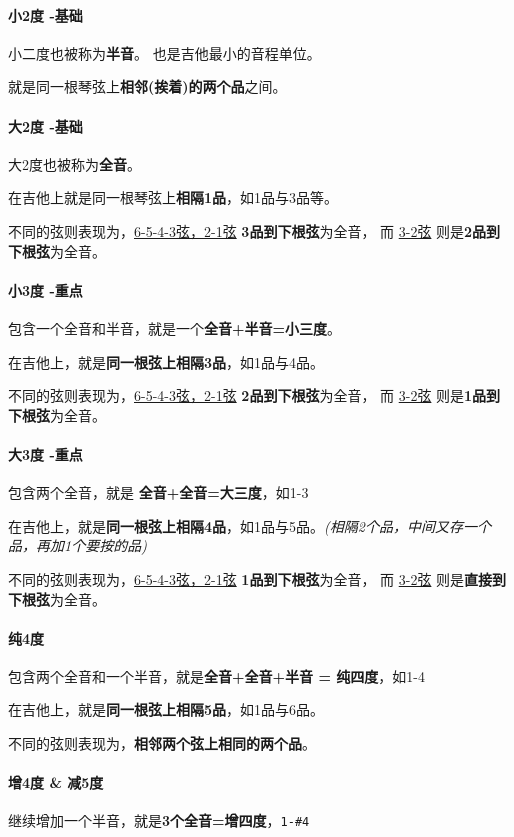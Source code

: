 \documentclass[UTF8,a4paper,12pt]{ctexbook}
\begin{document}
			\paragraph{小2度 -基础}
				小二度也被称为\textbf{半音}。 也是吉他最小的音程单位。
				
				就是同一根琴弦上\textbf{相邻(挨着)的两个品}之间。
				
			\paragraph{大2度 -基础}
				大2度也被称为\textbf{全音}。
				
				在吉他上就是同一根琴弦上\textbf{相隔1品}，如1品与3品等。
				
				不同的弦则表现为，\underline{6-5-4-3弦，2-1弦} \textbf{3品到下根弦}为全音， 而 \underline{3-2弦} 则是\textbf{2品到下根弦}为全音。
				
			\paragraph{小3度 -重点}
				包含一个全音和半音，就是一个\textbf{全音+半音=小三度}。
				
				在吉他上，就是\textbf{同一根弦上相隔3品}，如1品与4品。

				不同的弦则表现为，\underline{6-5-4-3弦，2-1弦} \textbf{2品到下根弦}为全音， 而 \underline{3-2弦} 则是\textbf{1品到下根弦}为全音。
				
			\paragraph{大3度 -重点}		
				包含两个全音，就是 \textbf{全音+全音=大三度}，如1-3
				
				在吉他上，就是\textbf{同一根弦上相隔4品}，如1品与5品。\textit{(相隔2个品，中间又存一个品，再加1个要按的品)}
				
				不同的弦则表现为，\underline{6-5-4-3弦，2-1弦} \textbf{1品到下根弦}为全音， 而 \underline{3-2弦} 则是\textbf{直接到下根弦}为全音。
			\paragraph{纯4度}
				包含两个全音和一个半音，就是\textbf{全音+全音+半音 = 纯四度}，如1-4
				
				在吉他上，就是\textbf{同一根弦上相隔5品}，如1品与6品。
				
				不同的弦则表现为，\textbf{相邻两个弦上相同的两个品}。
				
			\paragraph{增4度  \&  减5度}				
				继续增加一个半音，就是\textbf{3个全音=增四度}，\verb|1-#4|
				
\end{document}
